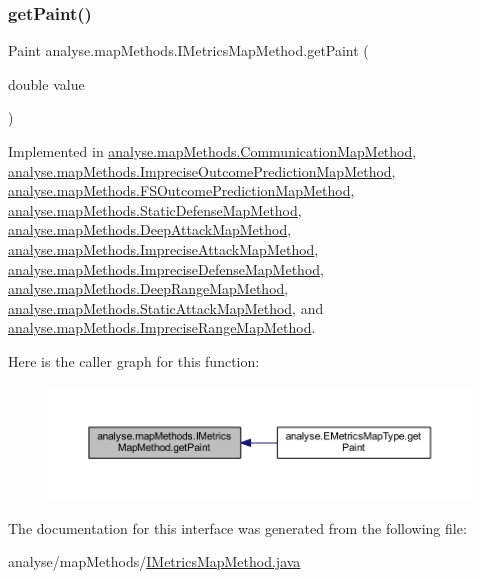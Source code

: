 \subsubsection{\texorpdfstring{get\+Paint()}{getPaint()}}
{\footnotesize\ttfamily Paint analyse.\+map\+Methods.\+I\+Metrics\+Map\+Method.\+get\+Paint (\begin{DoxyParamCaption}\item[{double}]{value }\end{DoxyParamCaption})}



Implemented in \mbox{\hyperlink{classanalyse_1_1map_methods_1_1_communication_map_method_ac51687c49fddaa463b261af6b17d9b65}{analyse.\+map\+Methods.\+Communication\+Map\+Method}}, \mbox{\hyperlink{classanalyse_1_1map_methods_1_1_imprecise_outcome_prediction_map_method_a15f78aca0ee7a41b811c3cc3342beca7}{analyse.\+map\+Methods.\+Imprecise\+Outcome\+Prediction\+Map\+Method}}, \mbox{\hyperlink{classanalyse_1_1map_methods_1_1_f_s_outcome_prediction_map_method_a6525a9b7d2475e2d46fb54924a5b5994}{analyse.\+map\+Methods.\+F\+S\+Outcome\+Prediction\+Map\+Method}}, \mbox{\hyperlink{classanalyse_1_1map_methods_1_1_static_defense_map_method_a6d258e3bedf292fe50799e68c9ce9ae8}{analyse.\+map\+Methods.\+Static\+Defense\+Map\+Method}}, \mbox{\hyperlink{classanalyse_1_1map_methods_1_1_deep_attack_map_method_a008dea396873a28b5fb5da7399a2ae07}{analyse.\+map\+Methods.\+Deep\+Attack\+Map\+Method}}, \mbox{\hyperlink{classanalyse_1_1map_methods_1_1_imprecise_attack_map_method_aa24d651474aeda58a1377a3feb882763}{analyse.\+map\+Methods.\+Imprecise\+Attack\+Map\+Method}}, \mbox{\hyperlink{classanalyse_1_1map_methods_1_1_imprecise_defense_map_method_a589823e45cd72e85ba4cec9594f8d95a}{analyse.\+map\+Methods.\+Imprecise\+Defense\+Map\+Method}}, \mbox{\hyperlink{classanalyse_1_1map_methods_1_1_deep_range_map_method_ac8f545e244fb4bb2fe446f23c5969976}{analyse.\+map\+Methods.\+Deep\+Range\+Map\+Method}}, \mbox{\hyperlink{classanalyse_1_1map_methods_1_1_static_attack_map_method_a2a26ddb0ec86169723f2c44d1781b52b}{analyse.\+map\+Methods.\+Static\+Attack\+Map\+Method}}, and \mbox{\hyperlink{classanalyse_1_1map_methods_1_1_imprecise_range_map_method_a4d98f7426b5e4a8b5f49793978c09f33}{analyse.\+map\+Methods.\+Imprecise\+Range\+Map\+Method}}.

Here is the caller graph for this function\+:
\nopagebreak
\begin{figure}[H]
\begin{center}
\leavevmode
\includegraphics[width=350pt]{interfaceanalyse_1_1map_methods_1_1_i_metrics_map_method_a102909023c32cebe3bc75052f55b24a0_icgraph}
\end{center}
\end{figure}


The documentation for this interface was generated from the following file\+:\begin{DoxyCompactItemize}
\item 
analyse/map\+Methods/\mbox{\hyperlink{_i_metrics_map_method_8java}{I\+Metrics\+Map\+Method.\+java}}\end{DoxyCompactItemize}

